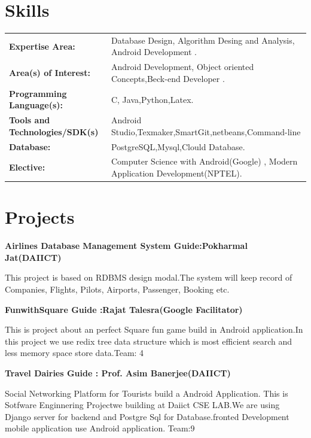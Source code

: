 \documentclass{article}
\begin{document}
\section{Skills}
\begin{tabular}{ll}
\textbf{Expertise Area:} & Database Design, Algorithm Desing and Analysis, Android Development . \\
\textbf{Area(s) of Interest:}& Android Development, Object oriented Concepts,Beck-end Developer .\\
\textbf{Programming Language(s):}& C, Java,Python,Latex.\\
\textbf{Tools and Technologies/SDK(s)} & Android Studio,Texmaker,SmartGit,netbeans,Command-line\\
\textbf{Database:} & PostgreSQL,Mysql,Clould Database.\\
\textbf{Elective:} & Computer Science with Android(Google) , Modern Application Development(NPTEL).

\end{tabular}


\section{Projects}

\begin{large}
\textbf{Airlines Database Management System \hspace*{3cm} Guide:Pokharmal      Jat(DAIICT) }
\end{large} 
This project is based on RDBMS design modal.The system
will keep record of Companies, Flights, Pilots, Airports, Passenger, Booking etc.

\begin{large}\textbf{FunwithSquare \hspace*{6.5cm} Guide  :Rajat Talesra(Google Facilitator)}
\end{large}
This is project about an perfect Square fun game  build in Android application.In this project we use redix tree data structure which is most efficient search and less memory space store data.\hspace*{5.5cm}Team: 4

\begin{large}\textbf{Travel Dairies \hspace{7cm} Guide : Prof. Asim Banerjee(DAIICT)}\end{large} 
Social Networking Platform for Tourists build a Android Application.
This is Sotfware Enginnering Projectwe building at Daiict CSE LAB.We are using Django server for backend and Postgre Sql for Database.fronted Development mobile application use Android application.\hspace{13cm} Team:9  
\end{document}
